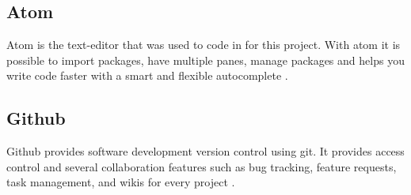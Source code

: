 \subsection{Atom}
Atom is the text-editor that was used to code in for this project. With atom it is possible to import packages, have multiple panes, manage packages and helps you write code faster with a smart and flexible autocomplete \cite{atom}.   
\subsection{Github}
Github provides software development version control using git. It provides access control and several collaboration features such as bug tracking, feature requests, task management, and wikis for every project \cite{github} . 